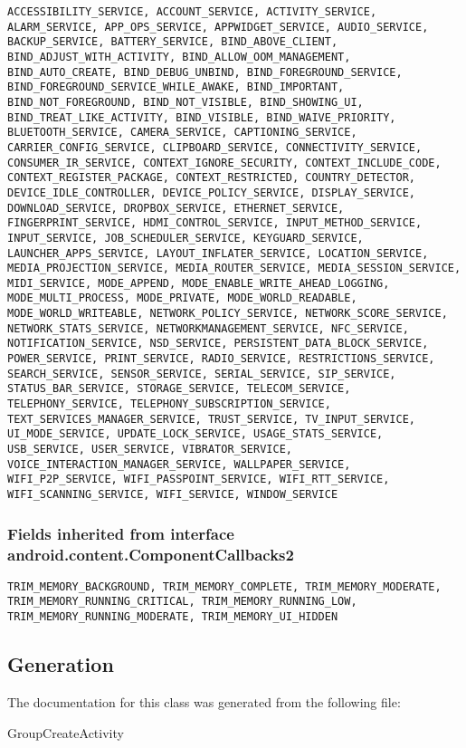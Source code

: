\begin{lstlisting}
ACCESSIBILITY_SERVICE, ACCOUNT_SERVICE, ACTIVITY_SERVICE, ALARM_SERVICE, APP_OPS_SERVICE, APPWIDGET_SERVICE, AUDIO_SERVICE, BACKUP_SERVICE, BATTERY_SERVICE, BIND_ABOVE_CLIENT, BIND_ADJUST_WITH_ACTIVITY, BIND_ALLOW_OOM_MANAGEMENT, BIND_AUTO_CREATE, BIND_DEBUG_UNBIND, BIND_FOREGROUND_SERVICE, BIND_FOREGROUND_SERVICE_WHILE_AWAKE, BIND_IMPORTANT, BIND_NOT_FOREGROUND, BIND_NOT_VISIBLE, BIND_SHOWING_UI, BIND_TREAT_LIKE_ACTIVITY, BIND_VISIBLE, BIND_WAIVE_PRIORITY, BLUETOOTH_SERVICE, CAMERA_SERVICE, CAPTIONING_SERVICE, CARRIER_CONFIG_SERVICE, CLIPBOARD_SERVICE, CONNECTIVITY_SERVICE, CONSUMER_IR_SERVICE, CONTEXT_IGNORE_SECURITY, CONTEXT_INCLUDE_CODE, CONTEXT_REGISTER_PACKAGE, CONTEXT_RESTRICTED, COUNTRY_DETECTOR, DEVICE_IDLE_CONTROLLER, DEVICE_POLICY_SERVICE, DISPLAY_SERVICE, DOWNLOAD_SERVICE, DROPBOX_SERVICE, ETHERNET_SERVICE, FINGERPRINT_SERVICE, HDMI_CONTROL_SERVICE, INPUT_METHOD_SERVICE, INPUT_SERVICE, JOB_SCHEDULER_SERVICE, KEYGUARD_SERVICE, LAUNCHER_APPS_SERVICE, LAYOUT_INFLATER_SERVICE, LOCATION_SERVICE, MEDIA_PROJECTION_SERVICE, MEDIA_ROUTER_SERVICE, MEDIA_SESSION_SERVICE, MIDI_SERVICE, MODE_APPEND, MODE_ENABLE_WRITE_AHEAD_LOGGING, MODE_MULTI_PROCESS, MODE_PRIVATE, MODE_WORLD_READABLE, MODE_WORLD_WRITEABLE, NETWORK_POLICY_SERVICE, NETWORK_SCORE_SERVICE, NETWORK_STATS_SERVICE, NETWORKMANAGEMENT_SERVICE, NFC_SERVICE, NOTIFICATION_SERVICE, NSD_SERVICE, PERSISTENT_DATA_BLOCK_SERVICE, POWER_SERVICE, PRINT_SERVICE, RADIO_SERVICE, RESTRICTIONS_SERVICE, SEARCH_SERVICE, SENSOR_SERVICE, SERIAL_SERVICE, SIP_SERVICE, STATUS_BAR_SERVICE, STORAGE_SERVICE, TELECOM_SERVICE, TELEPHONY_SERVICE, TELEPHONY_SUBSCRIPTION_SERVICE, TEXT_SERVICES_MANAGER_SERVICE, TRUST_SERVICE, TV_INPUT_SERVICE, UI_MODE_SERVICE, UPDATE_LOCK_SERVICE, USAGE_STATS_SERVICE, USB_SERVICE, USER_SERVICE, VIBRATOR_SERVICE, VOICE_INTERACTION_MANAGER_SERVICE, WALLPAPER_SERVICE, WIFI_P2P_SERVICE, WIFI_PASSPOINT_SERVICE, WIFI_RTT_SERVICE, WIFI_SCANNING_SERVICE, WIFI_SERVICE, WINDOW_SERVICE
\end{lstlisting}

\subsubsection{Fields inherited from interface android.content.ComponentCallbacks2}

\begin{lstlisting}
TRIM_MEMORY_BACKGROUND, TRIM_MEMORY_COMPLETE, TRIM_MEMORY_MODERATE, TRIM_MEMORY_RUNNING_CRITICAL, TRIM_MEMORY_RUNNING_LOW, TRIM_MEMORY_RUNNING_MODERATE, TRIM_MEMORY_UI_HIDDEN
\end{lstlisting}

\subsection{Generation}
The documentation for this class was generated from the following file\-:
\begin{DoxyCompactItemize}
\item GroupCreateActivity
\end{DoxyCompactItemize} 









